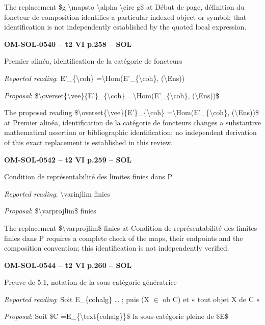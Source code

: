 The replacement \$g \textbackslash{}mapsto \textbackslash{}alpha \textbackslash{}circ g\$ at Début de page, définition du foncteur de composition identifies a particular indexed object or symbol; that identification is not independently established by the quoted local expression.\par
\par\noindent\textbf{OM-SOL-0540 -- t2 VI p.258 -- SOL}\par
Premier alinéa, identification de la catégorie de foncteurs\par
\emph{Reported reading}: E'\_\{\textbackslash{}coh\} =\allowbreak  \textbackslash{}Hom(E'\_\{\textbackslash{}coh\}, (\textbackslash{}Ens))\par
\emph{Proposal}: \$\textbackslash{}overset\{\textbackslash{}vee\}\{E'\}\_\{\textbackslash{}coh\} =\allowbreak  \textbackslash{}Hom(E'\_\{\textbackslash{}coh\}, (\textbackslash{}Ens))\$\par
The proposed reading \$\textbackslash{}overset\{\textbackslash{}vee\}\{E'\}\_\{\textbackslash{}coh\} =\allowbreak  \textbackslash{}Hom(E'\_\{\textbackslash{}coh\}, (\textbackslash{}Ens))\$ at Premier alinéa, identification de la catégorie de foncteurs changes a substantive mathematical assertion or bibliographic identification; no independent derivation of this exact replacement is established in this review.\par
\par\noindent\textbf{OM-SOL-0542 -- t2 VI p.259 -- SOL}\par
Condition de représentabilité des limites finies dans P\par
\emph{Reported reading}: \textbackslash{}varinjlim finies\par
\emph{Proposal}: \$\textbackslash{}varprojlim\$ finies\par
The replacement \$\textbackslash{}varprojlim\$ finies at Condition de représentabilité des limites finies dans P requires a complete check of the maps, their endpoints and the composition convention; this identification is not independently verified.\par
\par\noindent\textbf{OM-SOL-0544 -- t2 VI p.260 -- SOL}\par
Preuve de 5.1, notation de la sous-catégorie génératrice\par
\emph{Reported reading}: Soit E\_\{cohalg\} … ; puis (X \ensuremath{\in} ob C) et « tout objet X de C »\par
\emph{Proposal}: Soit \$C =\allowbreak  E\_\{\textbackslash{}text\{cohalg\}\}\$ la sous-catégorie pleine de \$E\$\par
